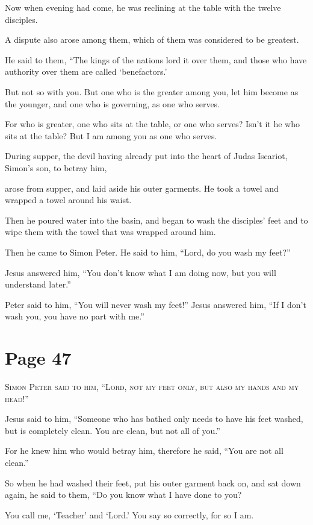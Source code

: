 Now when evening had come, he was reclining at the table with the twelve disciples.

A dispute also arose among them, which of them was considered to be greatest.

He said to them, “The kings of the nations lord it over them, and those who have authority over them are called ‘benefactors.’

But not so with you. But one who is the greater among you, let him become as the younger, and one who is governing, as one who serves.

For who is greater, one who sits at the table, or one who serves? Isn’t it he who sits at the table? But I am among you as one who serves.

During supper, the devil having already put into the heart of Judas Iscariot, Simon’s son, to betray him,

arose from supper, and laid aside his outer garments. He took a towel and wrapped a towel around his waist.

Then he poured water into the basin, and began to wash the disciples’ feet and to wipe them with the towel that was wrapped around him.

Then he came to Simon Peter. He said to him, “Lord, do you wash my feet?”

Jesus answered him, “You don’t know what I am doing now, but you will understand later.”

Peter said to him, “You will never wash my feet!” Jesus answered him, “If I don’t wash you, you have no part with me.”



\chapterornament
\section*{Page 47}

\lettrine{S}{imon Peter said to him, “Lord, not my feet only, but also my hands and my head!”}

Jesus said to him, “Someone who has bathed only needs to have his feet washed, but is completely clean. You are clean, but not all of you.”

For he knew him who would betray him, therefore he said, “You are not all clean.”

So when he had washed their feet, put his outer garment back on, and sat down again, he said to them, “Do you know what I have done to you?

You call me, ‘Teacher’ and ‘Lord.’ You say so correctly, for so I am.

